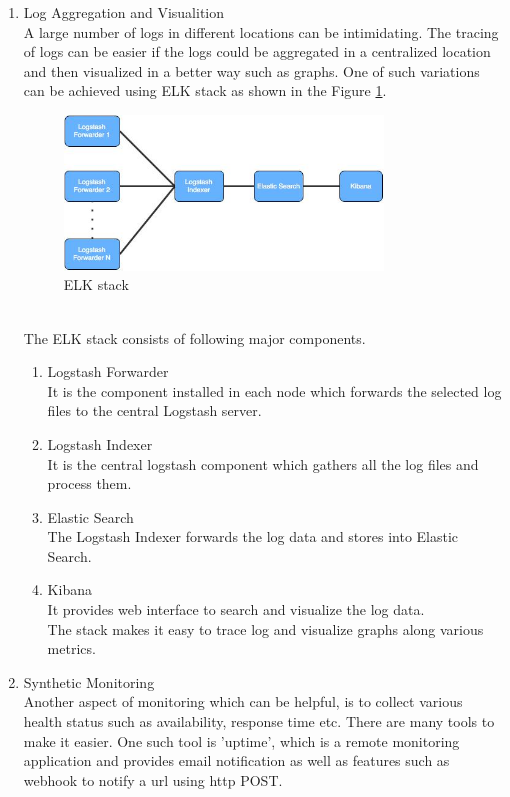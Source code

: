\begin{enumerate}
\item Log Aggregation and Visualition \\
A large number of logs in different locations can be intimidating. The tracing of logs can be easier if the logs could be aggregated in a centralized location and then visualized in a better way such as graphs. One of such variations can be achieved using ELK stack as shown in the Figure \ref{fig:challanges_of_microservices_architecture/elk_stack}. \cite{Anicas:2014aa} \cite{Newman:2015aa}
\begin{figure}[H]
\begin{center}
\includegraphics[width=0.8\textwidth]{figures/challenges_four_elk_stack}
\caption{ELK stack}
\label{fig:challanges_of_microservices_architecture/elk_stack}
\end{center}
\end{figure}
\\
The ELK stack consists of following major components.
\begin{enumerate}
\item Logstash Forwarder \\ It is the component installed in each node which forwards the selected log files to the central Logstash server.
\item Logstash Indexer \\ It is the central logstash component which gathers all the log files and process them.
\item Elastic Search \\ The Logstash Indexer forwards the log data and stores into Elastic Search.
\item Kibana \\ It provides web interface to search and visualize the log data.\\
The stack makes it easy to trace log and visualize graphs along various metrics.
\end{enumerate}
\item Synthetic Monitoring \\ Another aspect of monitoring which can be helpful, is to collect various health status such as availability, response time etc. There are many tools to make it easier. One such tool is 'uptime', which is a remote monitoring application and provides email notification as well as features such as webhook to notify a url using http POST.

\end{enumerate}
